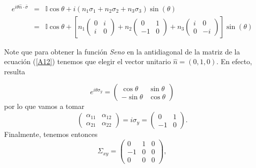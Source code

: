 \begin{eqnarray*}
e^{i\theta \hat{n}\cdot \bar{\sigma}} &=&\mathbb{I}\cos \theta +i\left(
n_{1}\sigma _{1}+n_{2}\sigma _{2}+n_{3}\sigma _{3}\right) \sin \left( \theta
\right)  \\
&=&\mathbb{I}\cos \theta +\left[ n_{1}\left( 
\begin{array}{cc}
0 & i \\ 
i & 0%
\end{array}%
\right) +n_{2}\left( 
\begin{array}{cc}
0 & 1 \\ 
-1 & 0%
\end{array}%
\right) +n_{3}\left( 
\begin{array}{cc}
i & 0 \\ 
0 & -i%
\end{array}%
\right) \right] \sin \left( \theta \right) 
\end{eqnarray*}

Note que para obtener la función \emph{Seno} en la antidiagonal de la matriz de la ecuación (\ref{A12}) tenemos que elegir el vector unitario $\hat{n}=(0,1,0)$. En efecto, resulta

\begin{equation}
e^{i \theta \sigma_{y}}=\left(\begin{array}{cc}
\cos \theta & \sin \theta \\
-\sin \theta & \cos \theta
\end{array}\right)
\end{equation}
por lo que vamos a tomar
\begin{equation}
\left(\begin{array}{ll}
\alpha_{11} & \alpha_{12} \\
\alpha_{21} & \alpha_{22}
\end{array}\right)=i \sigma_{y}=\left(\begin{array}{cc}
0 & 1 \\
-1 & 0
\end{array}\right).
\end{equation}
Finalmente, tenemos entonces
\begin{equation}
\Sigma_{x y}=\left(\begin{array}{ccc}
0 & 1 & 0 \\
-1 & 0 & 0 \\
0 & 0 & 0
\end{array}\right),
\end{equation}

